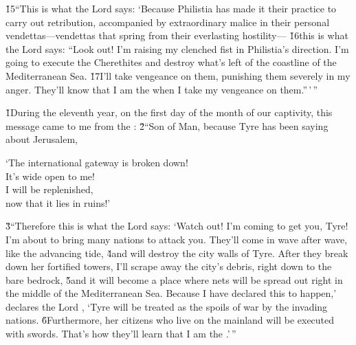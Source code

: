 \v{15}``This is what the Lord  says: `Because Philistia has made it their practice to carry out retribution, accompanied by extraordinary malice in their personal vendettas---vendettas that spring from their everlasting hostility--- \v{16}this is what the Lord  says: ``Look out! I'm raising my clenched fist in Philistia's direction. I'm going to execute the Cherethites and destroy what's left of the coastline of the Mediterranean Sea. \v{17}I'll take vengeance on them, punishing them severely in my anger. They'll know that I am the  when I take my vengeance on them.''\,'\,''

\v{1}During the eleventh year, on the first day of the month of our captivity, this message came to me from the : \v{2}``Son of Man, because Tyre has been saying about Jerusalem,

\begin{poetry}
\poeml `The international gateway is broken down! \\
\poemll    It's wide open to me! \\
\poeml I will be replenished, \\
\poemll    now that it lies in ruins!'
\end{poetry}

\v{3}``Therefore this is what the Lord  says: `Watch out! I'm coming to get you, Tyre! I'm about to bring many nations to attack you. They'll come in wave after wave, like the advancing tide, \v{4}and will destroy the city walls of Tyre. After they break down her fortified towers, I'll scrape away the city's debris, right down to the bare bedrock, \v{5}and it will become a place where nets will be spread out right in the middle of the Mediterranean Sea. Because I have declared this to happen,' declares the Lord , `Tyre will be treated as the spoils of war by the invading nations. \v{6}Furthermore, her citizens who live on the mainland will be executed with swords. That's how they'll learn that I am the .'\,''

